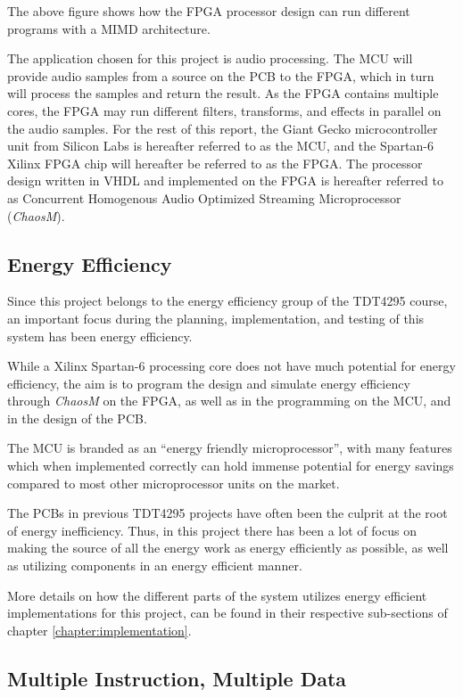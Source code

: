 The above figure shows how the FPGA processor
design can run different programs with a MIMD architecture.

The application chosen for this project is audio processing. The MCU will
provide audio samples from a source on the PCB to the FPGA, which in turn will
process the samples and return the result. As the FPGA contains multiple cores,
the FPGA may run different filters, transforms, and effects in parallel on the
audio samples. For the rest of this report, the Giant Gecko microcontroller unit
from Silicon Labs is hereafter referred to as the MCU, and the Spartan-6 Xilinx
FPGA chip will hereafter be referred to as the FPGA. The processor design
written in VHDL and implemented on the FPGA is hereafter referred to as
Concurrent Homogenous Audio Optimized Streaming Microprocessor (\textit{ChaosM}).

\subsection{Energy Efficiency}
Since this project belongs to the energy efficiency group of the TDT4295 course,
an important focus during the planning, implementation, and testing of this system
has been energy efficiency.

While a Xilinx Spartan-6\cite{fpga-chip} processing core does not have much
potential for energy efficiency, the aim is to program the design and simulate
energy efficiency through \textit{ChaosM} on the FPGA, as well as in the
programming on the MCU, and in the design of the PCB.

The MCU is branded as an ``energy friendly microprocessor'', with many features
which when implemented correctly can hold immense potential for energy savings
compared to most other microprocessor units on the market.

The PCBs in previous TDT4295 projects have often been the culprit at the root of
energy inefficiency. Thus, in this project there has been a lot of focus on making
the source of all the energy work as energy efficiently as possible, as well as
utilizing components in an energy efficient manner.

More details on how the different parts of the system utilizes energy efficient
implementations for this project, can be found in their respective sub-sections
of chapter \ref{chapter:implementation}.

\subsection{Multiple Instruction, Multiple Data}

